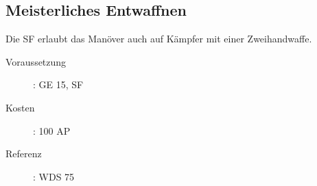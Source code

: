 \subsection{Meisterliches Entwaffnen}
\label{sf.meisterliches_entwaffnen}
Die SF erlaubt das Manöver  auch auf Kämpfer mit einer Zweihandwaffe.
\begin{description}
    \item[Voraussetzung]:
        GE 15, SF 
    \item [Kosten]:
        100 AP
    \item [Referenz]:
        WDS 75
\end{description}
